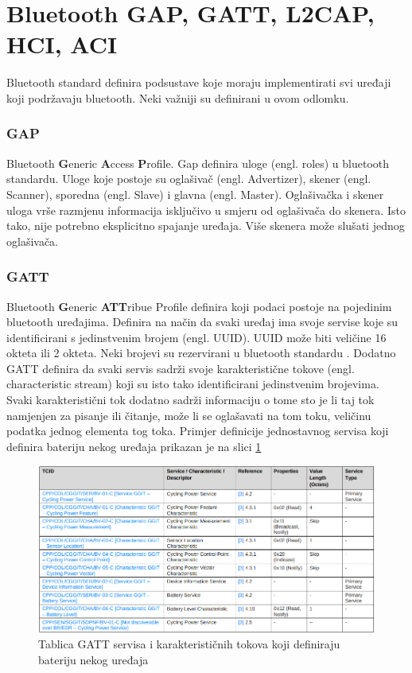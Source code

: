 \documentclass[times, utf8, diplomski]{diplomski}
\begin{document}
\section{Bluetooth GAP, GATT, L2CAP, HCI, ACI}
Bluetooth standard definira podsustave koje moraju implementirati svi uređaji koji podržavaju bluetooth. Neki važniji su definirani u ovom odlomku.

\subsubsection{GAP}
Bluetooth \textbf{G}eneric \textbf{A}ccess \textbf{P}rofile.
Gap definira uloge (engl. roles) u bluetooth standardu. Uloge koje postoje su oglašivač (engl. Advertizer), skener (engl. Scanner), sporedna (engl. Slave) i glavna (engl. Master). Oglašivačka i skener uloga vrše razmjenu informacija isključivo u smjeru od oglašivača do skenera. Isto tako, nije potrebno eksplicitno spajanje uređaja.
Više skenera može slušati jednog oglašivača.

\subsubsection{GATT}
Bluetooth \textbf{G}eneric \textbf{ATT}ribue Profile definira koji podaci postoje na pojedinim bluetooth uređajima. Definira na način da svaki uređaj ima svoje servise koje su identificirani s jedinstvenim brojem (engl. UUID). UUID može biti veličine 16 okteta ili 2 okteta. Neki brojevi su rezervirani u bluetooth standardu \cite{core41}.
Dodatno GATT definira da svaki servis sadrži svoje karakteristične tokove (engl. characteristic stream) koji su isto tako identificirani jedinstvenim brojevima. Svaki karakteristični tok dodatno sadrži informaciju o tome sto je li taj tok namjenjen za pisanje ili čitanje, može li se oglašavati na tom toku, veličinu podatka jednog elementa tog toka. Primjer definicije jednostavnog servisa koji definira bateriju nekog uređaja prikazan je na slici \ref{fig:gattexample}

\begin{figure}[H]
\includegraphics[width=\textwidth]{examplegatt_20230623_212042.png}
\centering
\caption{Tablica GATT servisa i karakterističnih tokova koji definiraju bateriju nekog uređaja}
\label{fig:gattexample}
\end{figure}
\end{document}
